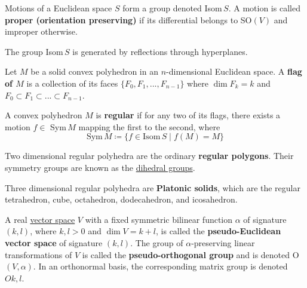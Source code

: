   Motions of a Euclidean space $S$ form a group denoted Isom$\,S$. A motion is called \textbf{proper (orientation preserving)} if its differential belongs to SO$(V)$ and improper otherwise. 

  \begin{lemma}
    \label{thm:isometries-are-generated-by-reflections}
    The group Isom$\,S$ is generated by reflections through hyperplanes. 
  \end{lemma}

  \begin{definition}[Flag of $M$]
    \label{def:flag-of-m}
    Let $M$ be a solid convex polyhedron in an $n$-dimensional Euclidean space. A \textbf{flag of $M$} is a collection of its faces $\{F_0, F_1, ..., F_{n-1}\}$ where $\dim{F_k} = k$ and $F_0 \subset F_1 \subset ... \subset F_{n-1}$. 
  \end{definition}

  \begin{definition}
    \label{def:regular-polyhedron}
    A convex polyhedron $M$ is \textbf{regular} if for any two of its flags, there exists a motion $f \in$ Sym$\,M$ mapping the first to the second, where 
    \begin{equation}
      \text{Sym}\,M \coloneqq \{f \in \text{Isom}\,S \;|\; f(M) = M \}
    \end{equation}
  \end{definition}

  Two dimensional regular polyhedra are the ordinary \textbf{regular polygons}. Their symmetry groups are known as the \hyperref[def:dihedral-group]{dihedral groups}.

  Three dimensional regular polyhedra are \textbf{Platonic solids}, which are the regular tetrahedron, cube, octahedron, dodecahedron, and icosahedron. 

  \begin{definition}
    \label{def:pseudo-euclidean-vector-space}
    A real \hyperref[def:vector-space]{vector space} $V$ with a fixed symmetric bilinear function $\alpha$ of signature $(k, l)$, where $k, l > 0$ and $\dim{V} = k+l$, is called the \textbf{pseudo-Euclidean vector space} of signature $(k, l)$. The group of $\alpha$-preserving linear transformations of $V$ is called the \textbf{pseudo-orthogonal group} and is denoted O$(V, \alpha)$. In an orthonormal basis, the corresponding matrix group is denoted $O{k,l}$. 
  \end{definition}

